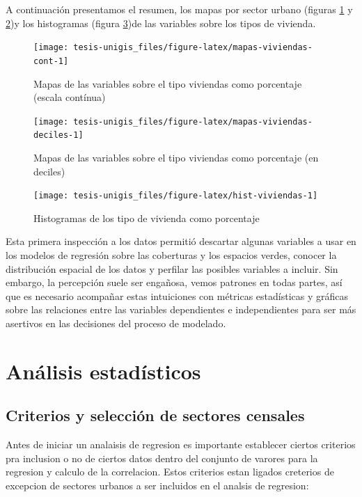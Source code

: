 \documentclass[12pt,]{book}
\begin{document}
A continuación presentamos el resumen, los mapas por sector urbano
(figuras \ref{fig:mapas-viviendas-cont} y
\ref{fig:mapas-viviendas-deciles})y los histogramas (figura
\ref{fig:hist-viviendas})de las variables sobre los tipos de vivienda.

\begin{figure}
\texttt{[image: tesis-unigis\_files/figure-latex/mapas-viviendas-cont-1]} \caption{Mapas de las variables sobre el tipo viviendas como porcentaje (escala contínua)}\label{fig:mapas-viviendas-cont}
\end{figure}

\begin{figure}
\texttt{[image: tesis-unigis\_files/figure-latex/mapas-viviendas-deciles-1]} \caption{Mapas de las variables sobre el tipo viviendas como porcentaje (en deciles)}\label{fig:mapas-viviendas-deciles}
\end{figure}

\begin{figure}
\texttt{[image: tesis-unigis\_files/figure-latex/hist-viviendas-1]} \caption{Histogramas de los tipo de vivienda como porcentaje}\label{fig:hist-viviendas}
\end{figure}

Esta primera inspección a los datos permitió descartar algunas variables
a usar en los modelos de regresión sobre las coberturas y los espacios
verdes, conocer la distribución espacial de los datos y perfilar las
posibles variables a incluir. Sin embargo, la percepción suele ser
engañosa, vemos patrones en todas partes, así que es necesario acompañar
estas intuiciones con métricas estadísticas y gráficas sobre las
relaciones entre las variables dependientes e independientes para ser
más asertivos en las decisiones del proceso de modelado.

\section{Análisis estadísticos}\label{analisis-estadisticos}

\subsection{Criterios y selección de sectores
censales}\label{criterios-y-seleccion-de-sectores-censales}

Antes de iniciar un analaisis de regresion es importante establecer
ciertos criterios pra inclusion o no de ciertos datos dentro del
conjunto de varores para la regresion y calculo de la correlacion. Estos
criterios estan ligados creterios de excepcion de sectores urbanos a ser
incluidos en el analsis de regresion:
\end{document}
